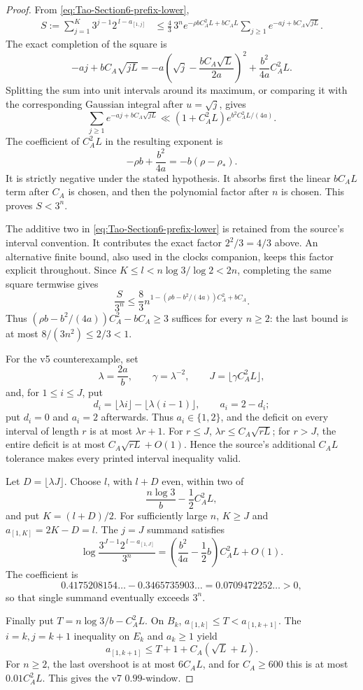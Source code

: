 \begin{proof}
From \eqref{eq:Tao-Section6-prefix-lower},
\[
\begin{split}
 S
 :=\sum_{j=1}^{K}3^{j-1}2^{\,l-a_{[1,j]}}
 &\le
 \frac43\,3^n e^{-\rho bC_A^2L+bC_AL}
 \sum_{j\ge1}e^{-aj+bC_A\sqrt{jL}}.
\end{split}
\]
The exact completion of the square is
\[
 -aj+bC_A\sqrt{jL}
 =-a\left(\sqrt j-\frac{bC_A\sqrt L}{2a}\right)^2
 +\frac{b^2}{4a}C_A^2L.
\]
Splitting the sum into unit intervals around its maximum, or comparing it
with the corresponding Gaussian integral after \(u=\sqrt j\), gives
\[
 \sum_{j\ge1}e^{-aj+bC_A\sqrt{jL}}
 \ll(1+C_A^2L)e^{b^2C_A^2L/(4a)}.
\]
The coefficient of \(C_A^2L\) in the resulting exponent is
\[
 -\rho b+\frac{b^2}{4a}=-b(\rho-\rho_*).
\]
It is strictly negative under the stated hypothesis.  It absorbs first the
linear \(bC_AL\) term after \(C_A\) is chosen, and then the polynomial factor
after \(n\) is chosen.  This proves \(S<3^n\).

The additive two in \eqref{eq:Tao-Section6-prefix-lower} is retained from
the source's interval convention.  It contributes the exact factor
\(2^2/3=4/3\) above.  An alternative finite bound, also used in the
clocks companion, keeps this factor explicit throughout.  Since
\(K\le l<n\log3/\log2<2n\), completing the same square termwise gives
\[
 \frac{S}{3^n}\le\frac83
 n^{1-(\rho b-b^2/(4a))C_A^2+bC_A}.
\]
Thus \((\rho b-b^2/(4a))C_A^2-bC_A\ge3\) suffices for every
\(n\ge2\): the last bound is at most \(8/(3n^2)\le2/3<1\).

For the v5 counterexample, set
\[
 \lambda=\frac{2a}{b},\qquad \gamma=\lambda^{-2},\qquad
 J=\lfloor\gamma C_A^2L\rfloor,
\]
and, for \(1\le i\le J\), put
\[
 d_i=\lfloor\lambda i\rfloor-\lfloor\lambda(i-1)\rfloor,\qquad
 a_i=2-d_i;
\]
put \(d_i=0\) and \(a_i=2\) afterwards.  Thus \(a_i\in\{1,2\}\), and the
deficit on every interval of length \(r\) is at most \(\lambda r+1\).
For \(r\le J\), \(\lambda r\le C_A\sqrt{rL}\); for \(r>J\), the entire
deficit is at most \(C_A\sqrt{rL}+O(1)\).  Hence the source's additional
\(C_AL\) tolerance makes every printed interval inequality valid.

Let \(D=\lfloor\lambda J\rfloor\).  Choose \(l\), with \(l+D\) even, within
two of
\[
 \frac{n\log3}{b}-\frac12C_A^2L,
\]
and put \(K=(l+D)/2\).  For sufficiently large \(n\), \(K\ge J\) and
\(a_{[1,K]}=2K-D=l\).  The \(j=J\) summand satisfies
\[
 \log\frac{3^{J-1}2^{\,l-a_{[1,J]}}}{3^n}
 =
 \left(\frac{b^2}{4a}-\frac12b\right)C_A^2L+O(1).
\]
The coefficient is
\[
 0.4175208154\ldots-0.3465735903\ldots
 =0.0709472252\ldots>0,
\]
so that single summand eventually exceeds \(3^n\).

Finally put \(T=n\log3/b-C_A^2L\).  On \(B_k\),
\(a_{[1,k]}\le T<a_{[1,k+1]}\).  The \(i=k,j=k+1\) inequality on \(E_k\)
and \(a_k\ge1\) yield
\[
 a_{[1,k+1]}\le T+1+C_A(\sqrt L+L).
\]
For \(n\ge2\), the last overshoot is at most \(6C_AL\), and for
\(C_A\ge600\) this is at most \(0.01C_A^2L\).  This gives the v7
\(0.99\)-window.
\end{proof}

